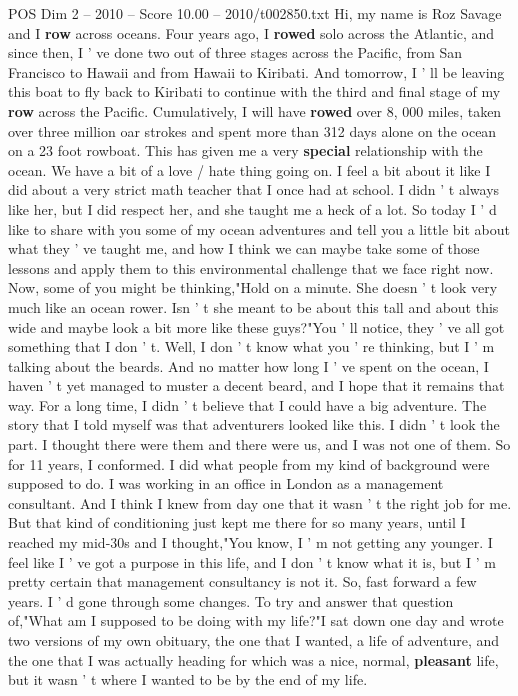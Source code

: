 \begin{textsample}{POS Dim 2 – 2010 – Score 10.00 – 2010/t002850.txt}  \label{ex:f2_pos_078}
Hi, my name is Roz Savage and I \textbf{row} across oceans.
Four years ago, I \textbf{rowed} solo across the Atlantic, and since then, I ' ve done two out of three stages across the Pacific, from San Francisco to Hawaii and from Hawaii to Kiribati.
And tomorrow, I ' ll be leaving this boat to fly back to Kiribati to continue with the third and final stage of my \textbf{row} across the Pacific.
Cumulatively, I will have \textbf{rowed} over 8, 000 miles, taken over three million oar strokes and spent more than 312 days alone on the ocean on a 23 foot rowboat.
This has given me a very \textbf{special} relationship with the ocean.
We have a bit of a love / hate thing going on.
I feel a bit about it like I did about a very strict math teacher that I once had at school.
I didn ' t always like her, but I did respect her, and she taught me a heck of a lot.
So today I ' d like to share with you some of my ocean adventures and tell you a little bit about what they ' ve taught me, and how I think we can maybe take some of those lessons and apply them to this environmental challenge that we face right now.
Now, some of you might be thinking,"Hold on a minute.
She doesn ' t look very much like an ocean rower.
Isn ' t she meant to be about this tall and about this wide and maybe look a bit more like these guys?"You ' ll notice, they ' ve all got something that I don ' t.
Well, I don ' t know what you ' re thinking, but I ' m talking about the beards.
And no matter how long I ' ve spent on the ocean, I haven ' t yet managed to muster a decent beard, and I hope that it remains that way.
For a long time, I didn ' t believe that I could have a big adventure.
The story that I told myself was that adventurers looked like this.
I didn ' t look the part.
I thought there were them and there were us, and I was not one of them.
So for 11 years, I conformed.
I did what people from my kind of background were supposed to do.
I was working in an office in London as a management consultant.
And I think I knew from day one that it wasn ' t the right job for me.
But that kind of conditioning just kept me there for so many years, until I reached my mid-30s and I thought,"You know, I ' m not getting any younger.
I feel like I ' ve got a purpose in this life, and I don ' t know what it is, but I ' m pretty certain that management consultancy is not it.
So, fast forward a few years.
I ' d gone through some changes.
To try and answer that question of,"What am I supposed to be doing with my life?"I sat down one day and wrote two versions of my own obituary, the one that I wanted, a life of adventure, and the one that I was actually heading for which was a nice, normal, \textbf{pleasant} life, but it wasn ' t where I wanted to be by the end of my life.

\end{textsample}
